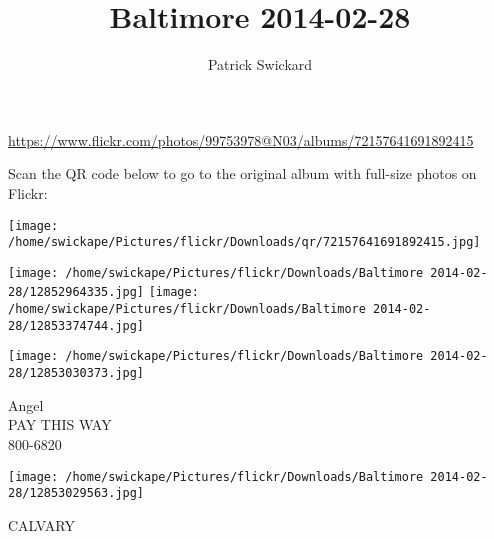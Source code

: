 \documentclass[10pt,letterpaper]{article}
\title{Baltimore 2014-02-28}
\author{Patrick Swickard}
\date{}
\begin{document}
\maketitle

\url{https://www.flickr.com/photos/99753978@N03/albums/72157641691892415}

Scan the QR code below to go to the original album with full-size photos on Flickr:

\texttt{[image: /home/swickape/Pictures/flickr/Downloads/qr/72157641691892415.jpg]}
\pagebreak

\texttt{[image: /home/swickape/Pictures/flickr/Downloads/Baltimore 2014-02-28/12852964335.jpg]}
\texttt{[image: /home/swickape/Pictures/flickr/Downloads/Baltimore 2014-02-28/12853374744.jpg]}

\vspace{0.25in}
\texttt{[image: /home/swickape/Pictures/flickr/Downloads/Baltimore 2014-02-28/12853030373.jpg]}

Angel\\
PAY THIS WAY\\
800{-}6820
\pagebreak

\texttt{[image: /home/swickape/Pictures/flickr/Downloads/Baltimore 2014-02-28/12853029563.jpg]}

CALVARY
\pagebreak
\end{document}
